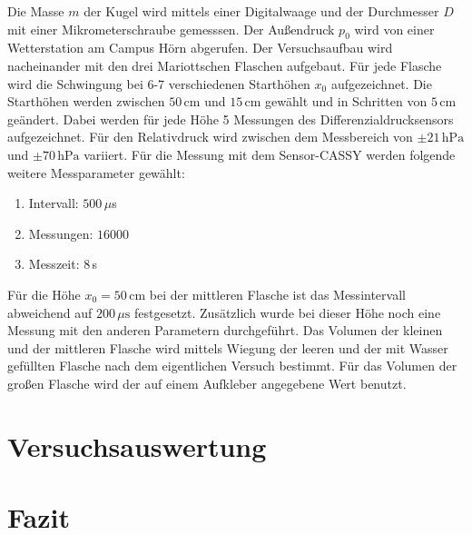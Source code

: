 \documentclass[a4paper, 12pt]{scrartcl}
\begin{document}
Die Masse $m$ der Kugel wird mittels einer Digitalwaage und der Durchmesser $D$ mit einer Mikrometerschraube gemesssen. Der Außendruck $p_0$ wird von einer Wetterstation am Campus Hörn abgerufen. Der Versuchsaufbau wird nacheinander mit den drei Mariottschen Flaschen aufgebaut. Für jede Flasche wird die Schwingung bei 6-7 verschiedenen Starthöhen $x_0$ aufgezeichnet. Die Starthöhen werden zwischen $50 \, \mathrm{cm}$ und $15 \, \mathrm{cm}$ gewählt und in Schritten von $5 \, \mathrm{cm}$ geändert. Dabei werden für jede Höhe 5 Messungen des Differenzialdrucksensors aufgezeichnet. Für den Relativdruck wird zwischen dem Messbereich von $\pm 21 \, \mathrm{hPa}$ und $\pm 70 \, \mathrm{hPa}$ variiert. Für die Messung mit dem Sensor-CASSY werden folgende weitere Messparameter gewählt:
\begin{enumerate}[-]
\setlength{\itemsep}{-5pt} 
\item Intervall: $500\,\mu$s 
\item Messungen: $16000$
\item Messzeit: $8\,$s
\end{enumerate}
Für die Höhe $x_0 = 50 \, \mathrm{cm}$ bei der mittleren Flasche ist das Messintervall abweichend auf $200 \,\mu\mathrm s$ festgesetzt. Zusätzlich wurde bei dieser Höhe noch eine Messung mit den anderen Parametern durchgeführt. Das Volumen der kleinen und der mittleren Flasche wird mittels Wiegung der leeren und der mit Wasser gefüllten Flasche nach dem eigentlichen Versuch bestimmt. Für das Volumen der großen Flasche wird der auf einem Aufkleber angegebene Wert benutzt. 



\section{Versuchsauswertung}

\section{Fazit}
\end{document}
